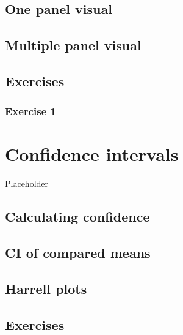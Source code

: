 \documentclass[english,10pt,a4paper,oneside]{book}
\begin{document}
\hypertarget{one-panel-visual}{%
\section{One panel visual}\label{one-panel-visual}}

\hypertarget{multiple-panel-visual}{%
\section{Multiple panel visual}\label{multiple-panel-visual}}

\hypertarget{exercises-5}{%
\section{Exercises}\label{exercises-5}}

\hypertarget{exercise-1-5}{%
\subsection{Exercise 1}\label{exercise-1-5}}

\hypertarget{confidence-intervals}{%
\chapter{Confidence intervals}\label{confidence-intervals}}

Placeholder

\hypertarget{calculating-confidence}{%
\section{Calculating confidence}\label{calculating-confidence}}

\hypertarget{ci-of-compared-means}{%
\section{CI of compared means}\label{ci-of-compared-means}}

\hypertarget{harrell-plots}{%
\section{Harrell plots}\label{harrell-plots}}

\hypertarget{exercises-6}{%
\section{Exercises}\label{exercises-6}}
\end{document}
